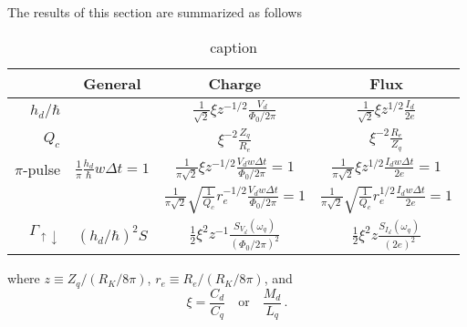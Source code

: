 
The results of this section are summarized as follows
\begin{table*}
  \centering
  \begin{tabular}{|r|c|c|c|}
    \hline
    & General & Charge & Flux \\
    \hline \hline
    $h_d/\hbar$
      &
      & $\frac{1}{\sqrt{2}} \xi z^{-1/2} \frac{V_d}{\Phi_0/2\pi}$
      & $\frac{1}{\sqrt{2}} \xi z^{1/2} \frac{I_d}{2e}$
      \\
    \hline
    $Q_c$
      &
      & $\xi^{-2} \frac{Z_q}{R_e}$
      & $\xi^{-2} \frac{R_e}{Z_q}$
      \\
    \hline
    $\pi$-pulse
      & $\frac{1}{\pi} \frac{h_d}{\hbar} w \Delta t = 1$
      & $\frac{1}{\pi\sqrt{2}} \xi z^{-1/2} \frac{V_d w \Delta t}{\Phi_0/2\pi} = 1$
      & $\frac{1}{\pi\sqrt{2}} \xi z^{1/2} \frac{I_d w \Delta t}{2e} = 1$
      \\
      &
      & $\frac{1}{\pi\sqrt{2}} \sqrt{\frac{1}{Q_c}} r_e^{-1/2} \frac{V_d w \Delta t}{\Phi_0/2\pi} = 1$
      & $\frac{1}{\pi\sqrt{2}} \sqrt{\frac{1}{Q_c}} r_e^{1/2} \frac{I_d w \Delta t}{2e} = 1$
      \\
    \hline
    $\Gamma_{\uparrow\downarrow}$
      & $(h_d/\hbar)^2 S$
      & $\frac{1}{2} \xi^2 z^{-1} \frac{S_{V_d}(\omega_q)}{(\Phi_0/2\pi)^2}$
      & $\frac{1}{2} \xi^2 z \frac{S_{I_d}(\omega_q)}{(2e)^2}$
      \\
    \hline
  \end{tabular}
  \caption{caption}
\end{table*}
where $z \equiv Z_q/(R_K/8\pi)$, $r_e \equiv R_e / (R_K/8\pi)$, and
\begin{displaymath}
  \xi = \frac{C_d}{C_q} \quad \text{or} \quad \frac{M_d}{L_q} \, .
\end{displaymath}
